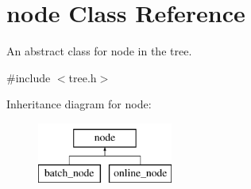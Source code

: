 \hypertarget{classnode}{\section{node Class Reference}
\label{classnode}
}


An abstract class for node in the tree.  




{\ttfamily \#include $<$tree.\+h$>$}

Inheritance diagram for node\+:\begin{figure}[H]
\begin{center}
\leavevmode
\includegraphics[height=2.000000cm]{classnode}
\end{center}
\end{figure}
